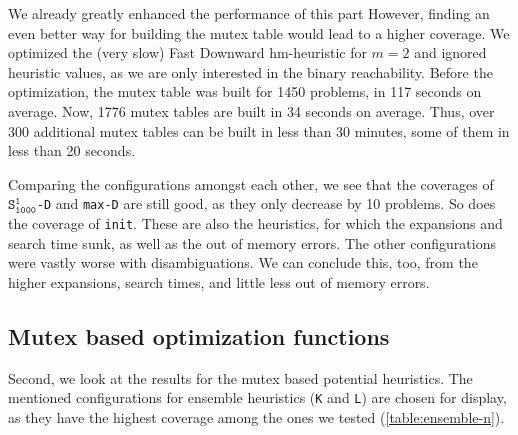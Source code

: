 We already greatly enhanced the performance of this part
However, finding an even better way for building the mutex table would lead to a higher coverage.
We optimized the (very slow) Fast Downward hm-heuristic for $m=2$ and ignored heuristic values, as we are only interested in the binary reachability.
Before the optimization, the mutex table was built for 1450 problems, in 117 seconds on average.
Now, 1776 mutex tables are built in 34 seconds on average.
Thus, over 300 additional mutex tables can be built in less than 30 minutes, some of them in less than 20 seconds.

Comparing the configurations amongst each other, we see that the coverages of $\texttt{S}_\texttt{1000}^\texttt{1}$\texttt{-D} and \texttt{max-D} are still good, as they only decrease by 10 problems.
So does the coverage of \texttt{init}.
These are also the heuristics, for which the expansions and search time sunk, as well as the out of memory errors.
The other configurations were vastly worse with disambiguations.
We can conclude this, too, from the higher expansions, search times, and little less out of memory errors.


\subsection{Mutex based optimization functions}\label{subsec:mutex-based-optimization-functions}
Second, we look at the results for the mutex based potential heuristics.
The mentioned configurations for ensemble heuristics (\texttt{K} and \texttt{L}) are chosen for display, as they have the highest coverage among the ones we tested (\autoref{table:ensemble-n}).

